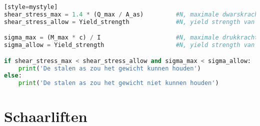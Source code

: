 \begin{lstlisting}[language=Python][style=mystyle]
shear_stress_max = 1.4 * (Q_max / A_as)         #N, maximale dwarskracht die op as wordt uitgeoefend
shear_stress_allow = Yield_strength             #N, yield strength van staal A36

sigma_max = (M_max * c) / I                     #N, maximale drukkracht die op de as wordt uitgeoefend
sigma_allow = Yield_strength                    #N, yield strength van staal A36

if shear_stress_max < shear_stress_allow and sigma_max < sigma_allow:
    print('De stalen as zou het gewicht kunnen houden')
else:
    print('De stalen as zou het gewicht niet kunnen houden')

\end{lstlisting}

\section{Schaarliften}
\label{se: bijlage_F schaarliften}
\vspace{\baselineskip}

